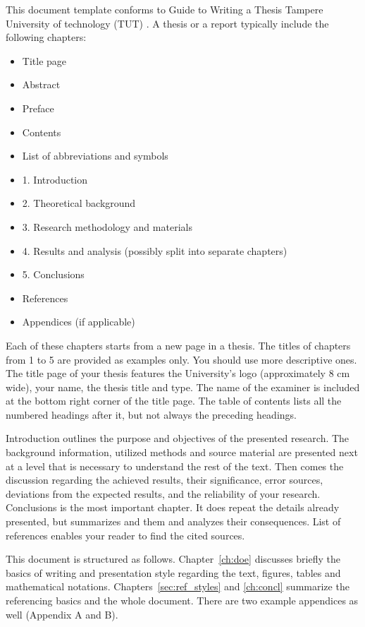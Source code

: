 \documentclass[12pt,a4paper,finnish]{tutthesis}
\begin{document}
This document template conforms to Guide to Writing a Thesis Tampere
University of technology (TUT) \cite{thesisguide13}. A thesis or a
report typically include the following chapters:
\begin{itemize}
  \setlength{\itemsep}{-10pt} %
\item[] Title page           %
\item[] Abstract
\item[] Preface
\item[] Contents
\item[] List of abbreviations and symbols
\item[] 1. Introduction
\item[] 2. Theoretical background
\item[] 3. Research methodology and materials
\item[] 4. Results and analysis (possibly split into separate chapters)
\item[] 5. Conclusions
\item[] References
\item[] Appendices (if applicable)
\end{itemize}


Each of these chapters starts from a new page in a thesis. The titles
of chapters from 1 to 5 are provided as examples only. You should use
more descriptive ones.  The title page of your thesis features the
University's logo (approximately 8 cm wide), your name, the thesis
title and type. The name of the examiner is included at the bottom
right corner of the title page. The table of contents lists all the
numbered headings after it, but not always the preceding headings.

Introduction outlines the purpose and objectives of the presented
research. The background information, utilized methods and source
material are presented next at a level that is necessary to understand
the rest of the text. Then comes the discussion regarding the achieved
results, their significance, error sources, deviations from the
expected results, and the reliability of your research. Conclusions is
the most important chapter. It does repeat the details already
presented, but summarizes and them and analyzes their
consequences. List of references enables your reader to find the cited
sources.



This document is structured as follows. Chapter~\ref{ch:doe}
discusses briefly the basics of writing and presentation style
regarding the text, figures, tables and mathematical
notations. Chapters~\ref{sec:ref_styles} and \ref{ch:concl} summarize
the referencing basics and the whole document. There are two example
appendices as well (Appendix A and B).
\end{document}
